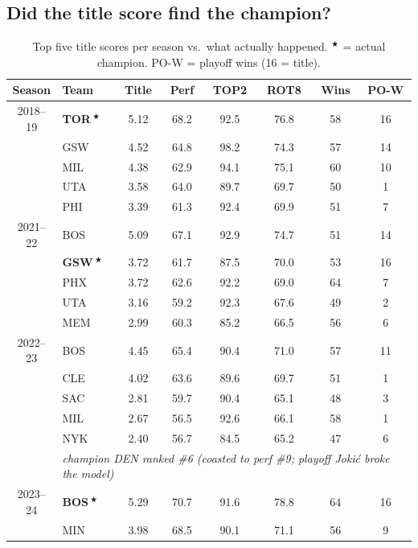 \documentclass[11pt]{article}
\newcommand{\champ}[1]{\textbf{#1}\,$^{\bigstar}$}
\begin{document}
\subsection{Did the title score find the champion?}

\begin{table}[h]\centering
\caption{Top five title scores per season vs.\ what actually happened.
$^{\bigstar}$ = actual champion. PO-W = playoff wins (16 = title).}
\scriptsize
\begin{tabular}{clcccccc}
\toprule
Season & Team & Title & Perf & TOP2 & ROT8 & Wins & PO-W \\
\midrule
2018--19 & \champ{TOR} & 5.12 & 68.2 & 92.5 & 76.8 & 58 & 16 \\
         & GSW         & 4.52 & 64.8 & 98.2 & 74.3 & 57 & 14 \\
         & MIL         & 4.38 & 62.9 & 94.1 & 75.1 & 60 & 10 \\
         & UTA         & 3.58 & 64.0 & 89.7 & 69.7 & 50 & 1  \\
         & PHI         & 3.39 & 61.3 & 92.4 & 69.9 & 51 & 7  \\
\midrule
2021--22 & BOS         & 5.09 & 67.1 & 92.9 & 74.7 & 51 & 14 \\
         & \champ{GSW} & 3.72 & 61.7 & 87.5 & 70.0 & 53 & 16 \\
         & PHX         & 3.72 & 62.6 & 92.2 & 69.0 & 64 & 7  \\
         & UTA         & 3.16 & 59.2 & 92.3 & 67.6 & 49 & 2  \\
         & MEM         & 2.99 & 60.3 & 85.2 & 66.5 & 56 & 6  \\
\midrule
2022--23 & BOS         & 4.45 & 65.4 & 90.4 & 71.0 & 57 & 11 \\
         & CLE         & 4.02 & 63.6 & 89.6 & 69.7 & 51 & 1  \\
         & SAC         & 2.81 & 59.7 & 90.4 & 65.1 & 48 & 3  \\
         & MIL         & 2.67 & 56.5 & 92.6 & 66.1 & 58 & 1  \\
         & NYK         & 2.40 & 56.7 & 84.5 & 65.2 & 47 & 6  \\
         & \multicolumn{7}{l}{\emph{champion DEN ranked \#6 (coasted to perf \#9; playoff Joki\'c broke the model)}} \\
\midrule
2023--24 & \champ{BOS} & 5.29 & 70.7 & 91.6 & 78.8 & 64 & 16 \\
         & MIN         & 3.98 & 68.5 & 90.1 & 71.1 & 56 & 9  \\

\end{tabular}
\end{table}
\end{document}
